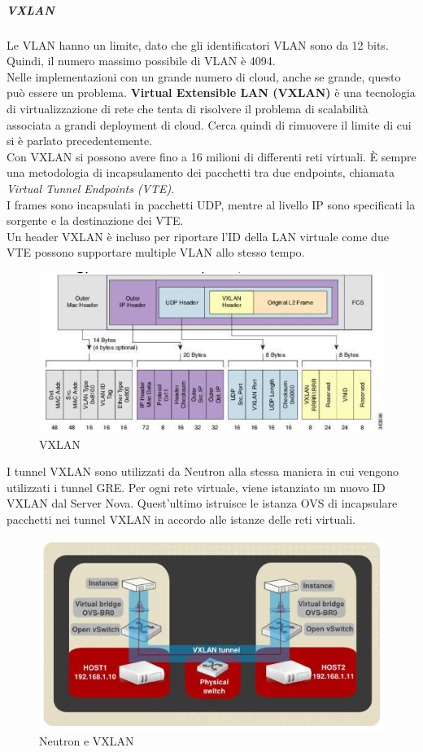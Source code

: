 \documentclass{article}
\begin{document}
\subparagraph{VXLAN}
Le VLAN hanno un limite, dato che gli identificatori VLAN sono da 12 bits. Quindi, il numero massimo possibile di VLAN è 4094. \\
Nelle implementazioni con un grande numero di cloud, anche se grande, questo può essere un problema.
\textbf{Virtual Extensible LAN (VXLAN)} è una tecnologia di virtualizzazione di rete che tenta di risolvere il problema di scalabilità associata a grandi deployment di cloud. Cerca quindi di rimuovere il limite di cui si è parlato precedentemente. \\
Con VXLAN si possono avere fino a 16 milioni di differenti reti virtuali. È sempre una metodologia di incapsulamento dei pacchetti tra due endpoints, chiamata \textit{Virtual Tunnel Endpoints (VTE)}. \\
I frames sono incapsulati in pacchetti UDP, mentre al livello IP sono specificati la sorgente e la destinazione dei VTE. \\
Un header VXLAN è incluso per riportare l'ID della LAN virtuale come due VTE possono supportare multiple VLAN allo stesso tempo. %
\begin{figure}[H]
    \centering
    \includegraphics[scale=0.4]{img/VXLAN.png}
    \caption{VXLAN}
\end{figure}\noindent
I tunnel VXLAN sono utilizzati da Neutron alla stessa maniera in cui vengono utilizzati i tunnel GRE. Per ogni rete virtuale, viene istanziato un nuovo ID VXLAN dal Server Nova. Quest'ultimo istruisce le istanza OVS di incapsulare pacchetti nei tunnel VXLAN in accordo alle istanze delle reti virtuali.
\begin{figure}[H]
    \centering
    \includegraphics[scale=0.4]{img/Neutron e VXLAN.png}
    \caption{Neutron e VXLAN}
\end{figure}\noindent
\end{document}
